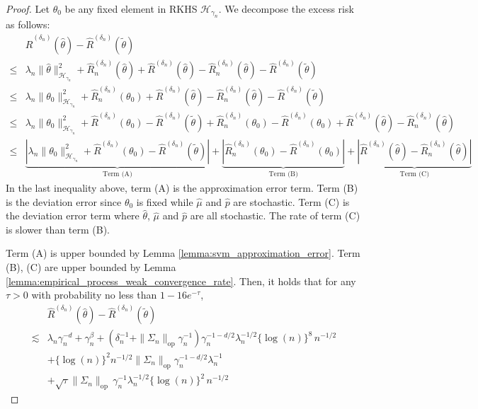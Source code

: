 \documentclass[12pt]{article}
\begin{document}
\begin{proof}

Let $\theta_0$ be any fixed element in RKHS $\mathcal{H}_{\gamma_n}$. We decompose the excess risk as follows:
    \begin{align*}
   &\widehat R^{({\delta_n})}(\widehat\theta) - \widehat R^{({\delta_n})}(\tilde\theta)\\
   \leq & \lambda_n\|\widehat\theta\|^2_{\mathcal{H}_{\gamma_n}}+ \widehat R_n^{({\delta_n})}(\widehat\theta)+\widehat R^{({\delta_n})}(\widehat\theta)  - \widehat R_n^{({\delta_n})}(\widehat\theta) - \widehat R^{({\delta_n})}(\tilde\theta)\\
   \leq & \lambda_n\|\theta_0\|^2_{\mathcal{H}_{\gamma_n}}  + \widehat R_n^{({\delta_n})}(\theta_0)+ \widehat R^{({\delta_n})}(\widehat\theta) - \widehat R_n^{({\delta_n})}(\widehat\theta) - \widehat R^{({\delta_n})}(\tilde\theta)\\
   \leq & \lambda_n\|\theta_0\|^2_{\mathcal{H}_{\gamma_n}}+\widehat R^{({\delta_n})}(\theta_0) -\widehat R^{({\delta_n})}(\tilde\theta) + \widehat R_n^{({\delta_n})}(\theta_0) - \widehat R^{({\delta_n})}(\theta_0) +
   \widehat R^{({\delta_n})}(\widehat\theta)
     -\widehat R_n^{({\delta_n})}(\widehat\theta) \\
   \leq & \underbrace{\left|\lambda_n\|\theta_0\|^2_{\mathcal{H}_{\gamma_n}}+\widehat R^{({\delta_n})}(\theta_0) -\widehat R^{({\delta_n})}(\tilde\theta)\right|}_{\text{Term (A)}} + \underbrace{\left|\widehat R_n^{({\delta_n})}(\theta_0) - \widehat R^{({\delta_n})}(\theta_0)\right|}_{\text{Term (B)}} + \underbrace{
   \left|\widehat R^{({\delta_n})}(\widehat\theta)
     -\widehat R_n^{({\delta_n})}(\widehat\theta)\right|}_{\text{Term  (C)}}
\end{align*}
In the last inequality above, term (A) is the approximation error term. Term (B) is the deviation error since $\theta_0$ is fixed while $\widehat \mu$ and $\widehat p$ are stochastic. Term (C) is the deviation error term where  $\widehat\theta$, $\widehat \mu$ and $\widehat p$ are all stochastic. The rate of term (C) is slower than term (B).


Term (A) is upper bounded by Lemma \ref{lemma:svm_approximation_error}. Term (B), (C) are upper bounded by Lemma \ref{lemma:empirical_process_weak_convergence_rate}.  Then, it holds that for any $\tau>0$ with probability no less than $1-16e^{-\tau}$,
\begin{align*}
   &\widehat R^{({\delta_n})}(\widehat\theta) - \widehat R^{({\delta_n})}(\tilde\theta)\\
   \lesssim & \lambda_n\gamma_n^{-d} + \gamma_n^{\beta} + \left(\delta_n^{-1}+\|\Sigma_n\|_{\mathrm{op}}\gamma_n^{-1}\right)\gamma_n^{-1-d/2}\lambda_n^{-1/2}\{\log(n)\}^{8}\,n^{-1/2}\\
& + \{\log(n)\}^2 n^{-1/2}\|\Sigma_n\|_{\mathrm{op}}\gamma_n^{-1-d/2}\lambda_n^{-1}\\
& + \sqrt{\tau} \|\Sigma_n\|_{\mathrm{op}}\,\gamma_n^{-1}\lambda_n^{-1/2}\{\log(n)\}^2\,n^{-1/2}
\end{align*}


\end{proof}
\end{document}
